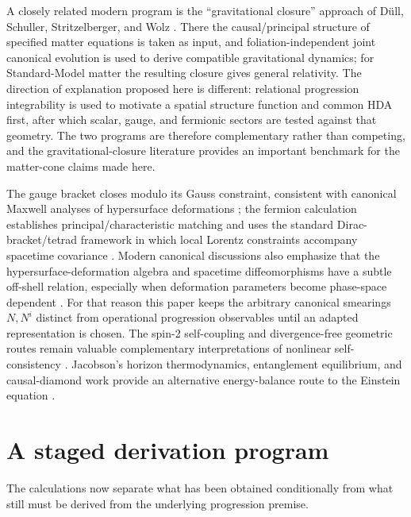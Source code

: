 \documentclass[11pt]{article}
\begin{document}
A closely related modern program is the ``gravitational closure'' approach of D\"ull, Schuller, Stritzelberger, and Wolz \cite{Duell2018}. There the causal/principal structure of specified matter equations is taken as input, and foliation-independent joint canonical evolution is used to derive compatible gravitational dynamics; for Standard-Model matter the resulting closure gives general relativity. The direction of explanation proposed here is different: relational progression integrability is used to motivate a spatial structure function and common HDA first, after which scalar, gauge, and fermionic sectors are tested against that geometry. The two programs are therefore complementary rather than competing, and the gravitational-closure literature provides an important benchmark for the matter-cone claims made here.

The gauge bracket closes modulo its Gauss constraint, consistent with canonical Maxwell analyses of hypersurface deformations \cite{KucharStone1987}; the fermion calculation establishes principal/characteristic matching and uses the standard Dirac-bracket/tetrad framework in which local Lorentz constraints accompany spacetime covariance \cite{NelsonTeitelboim1978}. Modern canonical discussions also emphasize that the hypersurface-deformation algebra and spacetime diffeomorphisms have a subtle off-shell relation, especially when deformation parameters become phase-space dependent \cite{Thiemann2024,Bojowald2025}. For that reason this paper keeps the arbitrary canonical smearings $N,N^i$ distinct from operational progression observables until an adapted representation is chosen. The spin-2 self-coupling and divergence-free geometric routes remain valuable complementary interpretations of nonlinear self-consistency \cite{Deser1970,Deser2010,Lovelock1971}. Jacobson's horizon thermodynamics, entanglement equilibrium, and causal-diamond work provide an alternative energy-balance route to the Einstein equation \cite{Jacobson1995,Jacobson2016,JacobsonVisser2019}.

\section{A staged derivation program}

The calculations now separate what has been obtained conditionally from what still must be derived from the underlying progression premise.
\end{document}
